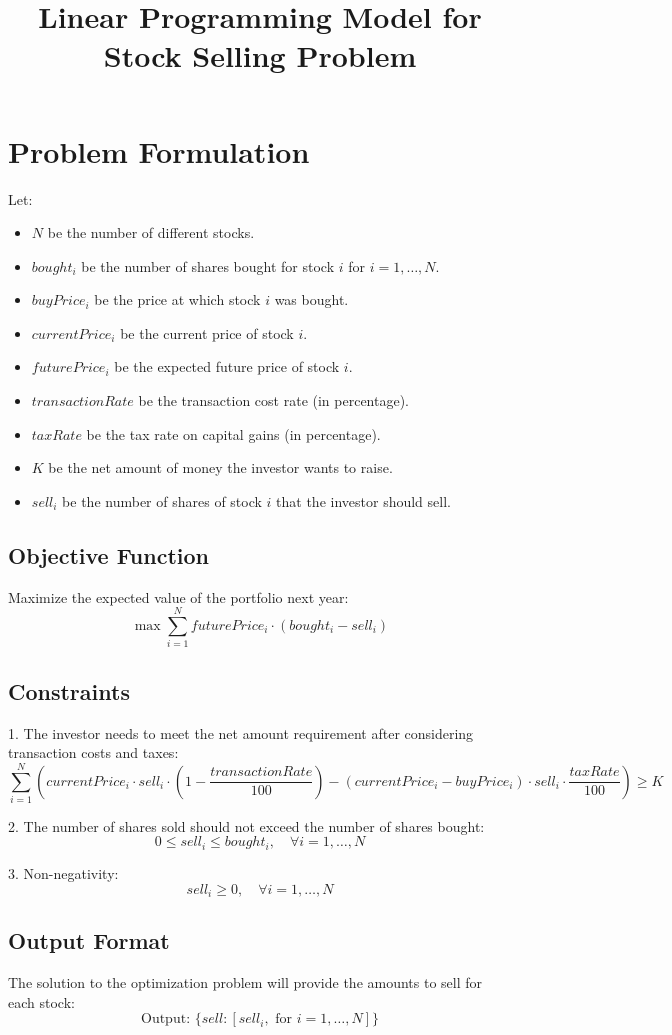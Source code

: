 \documentclass{article}
\begin{document}
\title{Linear Programming Model for Stock Selling Problem}
\author{}
\date{}
\maketitle

\section*{Problem Formulation}

Let:
\begin{itemize}
    \item \( N \) be the number of different stocks.
    \item \( bought_i \) be the number of shares bought for stock \( i \) for \( i = 1, \ldots, N \).
    \item \( buyPrice_i \) be the price at which stock \( i \) was bought.
    \item \( currentPrice_i \) be the current price of stock \( i \).
    \item \( futurePrice_i \) be the expected future price of stock \( i \).
    \item \( transactionRate \) be the transaction cost rate (in percentage).
    \item \( taxRate \) be the tax rate on capital gains (in percentage).
    \item \( K \) be the net amount of money the investor wants to raise.
    \item \( sell_i \) be the number of shares of stock \( i \) that the investor should sell.
\end{itemize}

\subsection*{Objective Function}

Maximize the expected value of the portfolio next year:
\[
\max \sum_{i=1}^{N} futurePrice_i \cdot (bought_i - sell_i)
\]

\subsection*{Constraints}

1. The investor needs to meet the net amount requirement after considering transaction costs and taxes:
\[
\sum_{i=1}^{N} \left( currentPrice_i \cdot sell_i \cdot (1 - \frac{transactionRate}{100}) - (currentPrice_i - buyPrice_i) \cdot sell_i \cdot \frac{taxRate}{100} \right) \geq K
\]

2. The number of shares sold should not exceed the number of shares bought:
\[
0 \leq sell_i \leq bought_i, \quad \forall i = 1, \ldots, N
\]

3. Non-negativity:
\[
sell_i \geq 0, \quad \forall i = 1, \ldots, N
\]

\subsection*{Output Format}

The solution to the optimization problem will provide the amounts to sell for each stock:
\[
\text{Output: } \{ sell: [sell_i, \text{ for } i = 1, \ldots, N] \}
\]
\end{document}
